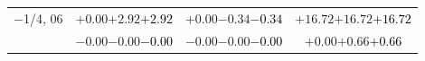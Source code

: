 \documentclass[compress]{beamer}
\begin{document}
\begin{frame}
\begin{tabular}{r | c | c | c}
$-$1/4, 06 & $+0.00$\hspace{0.1 cm}$+2.92$\hspace{0.1 cm}\textcolor{black}{$+2.92$} & $+0.00$\hspace{0.1 cm}$-0.34$\hspace{0.1 cm}\textcolor{black}{$-0.34$} & $+16.72$\hspace{0.1 cm}$+16.72$\hspace{0.1 cm}\textcolor{black}{$+16.72$} \\
           & $-0.00$\hspace{0.1 cm}$-0.00$\hspace{0.1 cm}\textcolor{black}{$-0.00$} & $-0.00$\hspace{0.1 cm}$-0.00$\hspace{0.1 cm}\textcolor{black}{$-0.00$} & $+0.00$\hspace{0.1 cm}$+0.66$\hspace{0.1 cm}\textcolor{black}{$+0.66$} \\
\end{tabular}
\end{frame}
\end{document}
